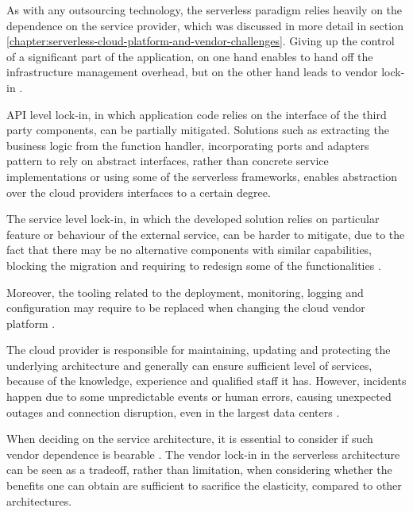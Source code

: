As with any outsourcing technology, the serverless paradigm relies heavily on the dependence on the service provider, which was discussed in more detail in section \ref{chapter:serverless-cloud-platform-and-vendor-challenges}.
Giving up the control of a significant part of the application, on one hand enables to hand off the infrastructure management overhead, but on the other hand leads to vendor lock-in \cite{MartinFowlerServerless}.

API level lock-in, in which application code relies on the interface of the third party components, can be partially mitigated.
Solutions such as extracting the business logic from the function handler, incorporating ports and adapters pattern to rely on abstract interfaces, rather than concrete service implementations or using some of the serverless frameworks, enables abstraction over the cloud providers interfaces to a certain degree.

The service level lock-in, in which the developed solution relies on particular feature or behaviour of the external service, can be harder to mitigate, due to the fact that there may be no alternative components with similar capabilities, blocking the migration and requiring to redesign some of the functionalities \cite{EvaluationOfServerlessApplicationProgrammingModel}.

Moreover, the tooling related to the deployment, monitoring, logging and configuration may require to be replaced when changing the cloud vendor platform \cite{MartinFowlerServerless}.

The cloud provider is responsible for maintaining, updating and protecting the underlying architecture and generally can ensure sufficient level of services, because of the knowledge, experience and qualified staff it has. However, incidents happen due to some unpredictable events or human errors, causing unexpected outages and connection disruption, even in the largest data centers \cite{EvaluationOfServerlessApplicationProgrammingModel}.

When deciding on the service architecture, it is essential to consider if such vendor dependence is bearable \cite{LeveragingServerlessCloudComputingArchitectures}.
The vendor lock-in in the serverless architecture can be seen as a tradeoff, rather than limitation, when considering whether the benefits one can obtain are sufficient to sacrifice the elasticity, compared to other architectures.



